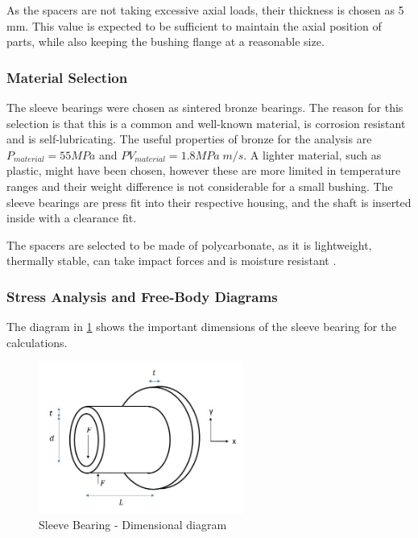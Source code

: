 As the spacers are not taking excessive axial loads, their thickness is chosen as 5 mm. This value is expected to be sufficient to maintain the axial position of parts, while also keeping the bushing flange at a reasonable size. 

\subsubsection{Material Selection}
The sleeve bearings were chosen as sintered bronze bearings. The reason for this selection is that this is a common and well-known material, is corrosion resistant and is self-lubricating. The useful properties of bronze for the analysis are $P_{material}=55 MPa$ and $PV_{material}=1.8 MPa \;m/s$. A lighter material, such as plastic, might have been chosen, however these are more limited in temperature ranges and their weight difference is not considerable for a small bushing. The sleeve bearings are press fit into their respective housing, and the shaft is inserted inside with a clearance fit.

The spacers are selected to be made of polycarbonate, as it is lightweight, thermally stable, can take impact forces and is moisture resistant \cite{omnexus_polycarbonate_nodate}. 

\subsubsection{Stress Analysis and Free-Body Diagrams}

The diagram in \ref{fig:bearing_dimensions} shows the important dimensions of the sleeve bearing for the calculations.

\begin{figure}
    \centering
    \includegraphics[width=0.6\textwidth]{4_Analysis/img/Bearing/bearing.JPG}
    \caption{Sleeve Bearing - Dimensional diagram}
    \label{fig:bearing_dimensions}
\end{figure}

